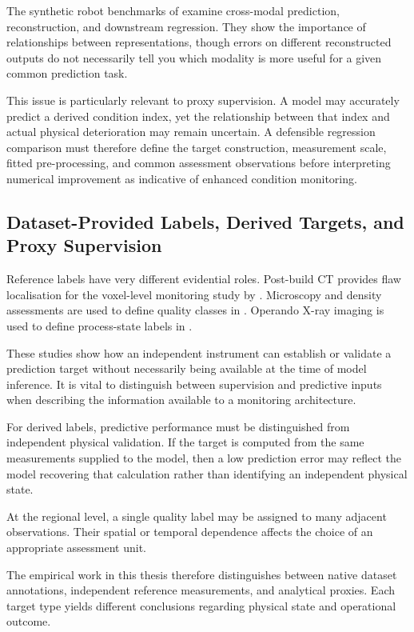 The synthetic robot benchmarks of \textcite{Altinses2025Performance} examine cross-modal prediction,
reconstruction, and downstream regression. They show the importance
of relationships between representations, though errors on different reconstructed outputs do not
necessarily tell you which modality is more useful for a given common prediction task.

This issue is particularly relevant to proxy supervision. A model may accurately predict a derived
condition index, yet the relationship between that index and actual physical deterioration may
remain uncertain. A defensible regression comparison must therefore define the target construction,
measurement scale, fitted pre-processing, and common assessment observations before interpreting
numerical improvement as indicative of enhanced condition monitoring.

\subsection{Dataset-Provided Labels, Derived Targets, and Proxy Supervision}

Reference labels have very different evidential roles. Post-build CT provides flaw localisation for
the voxel-level monitoring study by \textcite{Petrich2021Multimodal}. Microscopy and
density assessments are used to define quality classes in \textcite{Li2022A}. Operando X-ray
imaging is used to define process-state labels in \textcite{Pandiyan2022Deep}.

These studies show how an independent instrument can establish or validate a prediction target
without necessarily being available at the time of model inference. It is vital to distinguish
between supervision and predictive inputs when describing the information available to a monitoring
architecture.

For derived labels, predictive performance must be distinguished from independent physical
validation. If the target is computed from the same measurements supplied to the model, then a low
prediction error may reflect the model recovering that calculation rather than identifying an
independent physical state.

At the regional level, a single quality label may be assigned to many adjacent observations. Their
spatial or temporal dependence affects the choice of an appropriate assessment unit.

The empirical work in this thesis therefore distinguishes between native dataset annotations,
independent reference measurements, and analytical proxies. Each target type yields different
conclusions regarding physical state and operational outcome.

